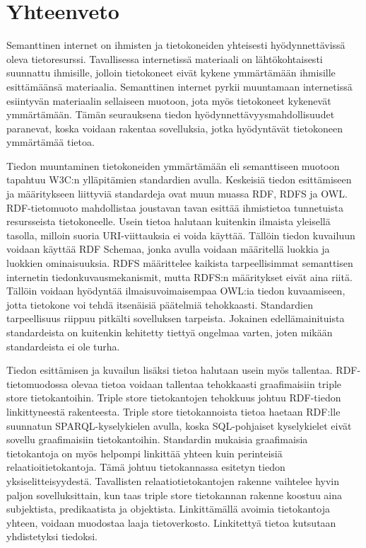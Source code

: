 \documentclass[finnish, 12pt, a4paper, elec, utf8, pdfa, online]{aaltothesis}
\begin{document}
{\section{Yhteenveto}


Semanttinen internet on ihmisten ja tietokoneiden yhteisesti hyödynnettävissä oleva tietoresurssi. Tavallisessa internetissä materiaali on lähtökohtaisesti suunnattu ihmisille, jolloin tietokoneet eivät kykene ymmärtämään ihmisille esittämäänsä materiaalia. Semanttinen internet pyrkii muuntamaan internetissä esiintyvän materiaalin sellaiseen muotoon, jota myös tietokoneet kykenevät ymmärtämään. Tämän seurauksena tiedon hyödynnettävyysmahdollisuudet paranevat, koska voidaan rakentaa sovelluksia, jotka hyödyntävät tietokoneen ymmärtämää tietoa.

Tiedon muuntaminen tietokoneiden ymmärtämään eli semanttiseen muotoon tapahtuu W3C:n ylläpitämien standardien avulla. Keskeisiä tiedon esittämiseen ja määritykseen liittyviä standardeja ovat muun muassa RDF, RDFS ja OWL. RDF-tietomuoto mahdollistaa joustavan tavan esittää ihmistietoa tunnetuista resursseista tietokoneelle. Usein tietoa halutaan kuitenkin ilmaista yleisellä tasolla, milloin suoria URI-viittauksia ei voida käyttää. Tällöin tiedon kuvailuun voidaan käyttää RDF Schemaa, jonka avulla voidaan määritellä luokkia ja luokkien ominaisuuksia. RDFS määrittelee kaikista tarpeellisimmat semanttisen internetin tiedonkuvausmekanismit, mutta RDFS:n määritykset eivät aina riitä. Tällöin voidaan hyödyntää ilmaisuvoimaisempaa OWL:ia tiedon kuvaamiseen, jotta tietokone voi tehdä itsenäisiä päätelmiä tehokkaasti. Standardien tarpeellisuus riippuu pitkälti sovelluksen tarpeista. Jokainen edellämainituista standardeista on kuitenkin kehitetty tiettyä ongelmaa varten, joten mikään standardeista ei ole turha.

Tiedon esittämisen ja kuvailun lisäksi tietoa halutaan usein myös tallentaa. RDF-tietomuodossa olevaa tietoa voidaan tallentaa tehokkaasti graafimaisiin triple store tietokantoihin. Triple store tietokantojen tehokkuus johtuu RDF-tiedon linkittyneestä rakenteesta. Triple store tietokannoista tietoa haetaan RDF:lle suunnatun SPARQL-kyselykielen avulla, koska SQL-pohjaiset kyselykielet eivät sovellu graafimaisiin tietokantoihin. Standardin mukaisia graafimaisia tietokantoja on myös helpompi linkittää yhteen kuin perinteisiä relaatioitietokantoja. Tämä johtuu tietokannassa esitetyn tiedon yksiselitteisyydestä. Tavallisten relaatiotietokantojen rakenne vaihtelee hyvin paljon sovelluksittain, kun taas triple store tietokannan rakenne koostuu aina subjektista, predikaatista ja objektista. Linkittämällä avoimia tietokantoja yhteen, voidaan muodostaa laaja tietoverkosto. Linkitettyä tietoa kutsutaan yhdistetyksi tiedoksi.

}
\end{document}
